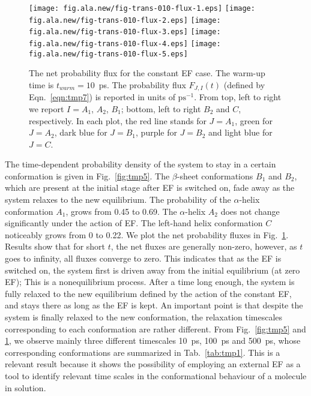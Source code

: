 \documentclass[a4paper,preprint,unsortedaddress,onecolumn]{revtex4-1}
\begin{document}
\begin{figure}
  \centering
  \texttt{[image: fig.ala.new/fig-trans-010-flux-1.eps]}
  \texttt{[image: fig.ala.new/fig-trans-010-flux-2.eps]}
  \texttt{[image: fig.ala.new/fig-trans-010-flux-3.eps]}
  \texttt{[image: fig.ala.new/fig-trans-010-flux-4.eps]}
  \texttt{[image: fig.ala.new/fig-trans-010-flux-5.eps]}
  \caption{
    The net probability flux for the constant EF case.
    The warm-up time is $t_{warm} = 10$~ps.
    The probability flux $F_{J,I}(t)$ (defined by Eqn.~\eqref{eqn:tmp7}) is reported in units of $\textrm{ps}^{-1}$.
    From top, left to right we report $I = A_1$, $A_2$, $B_1$; bottom, left to right $B_2$ and
    $C$, respectively. In each plot, the red line stands for $J=A_1$,
    green for $J=A_2$, dark blue for $J=B_1$, purple for $J=B_2$ and light blue
    for $J=C$.
    }
  \label{fig:tmp6}
\end{figure}

The time-dependent probability density of the system to stay in a certain
conformation is given in
Fig.~\ref{fig:tmp5}. The $\beta$-sheet conformations $B_1$ and $B_2$,
which are present at the initial stage after EF is switched on,
fade away as the system relaxes to the new equilibrium. The
probability of the $\alpha$-helix conformation $A_1$, grows from 0.45 to 0.69.
The $\alpha$-helix $A_2$  does not change significantly  under the action of EF.
The left-hand helix conformation $C$ noticeably grows from 0 to 0.22.
We plot the net probability fluxes in Fig.~\ref{fig:tmp6}.
Results show that for short $t$, the net fluxes are generally non-zero, however, 
as $t$ goes to infinity,
all fluxes converge to zero. This indicates
that as the EF is switched on, the system first is driven away from the initial
equilibrium (at zero EF);  This is a nonequilibrium process.
After a time long enough, the system
is fully relaxed to the new equilibrium defined by the action of the constant EF,
and stays there as long as the EF is kept.
An important point is that despite the system is finally relaxed to the new conformation,
the relaxation timescales corresponding to each conformation are rather different. 
From Fig.~\ref{fig:tmp5} and \ref{fig:tmp6}, we observe mainly
three different timescales 10~ps, 100~ps and 500~ps,
whose corresponding conformations are summarized in Tab.~\ref{tab:tmp1}.
This is a relevant result because it shows the possibility of employing an external EF as a tool to identify relevant time scales in the conformational behaviour of a molecule in solution.
\end{document}
